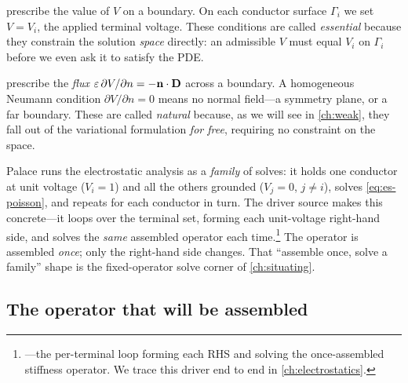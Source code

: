 \begin{description}[style=nextline,leftmargin=1em,font=\normalfont\itshape]
  \item[Dirichlet (essential) conditions] prescribe the value of $V$ on a
  boundary. On each conductor surface $\Gamma_i$ we set $V=V_i$, the applied
  terminal voltage. These conditions are called \emph{essential} because they
  constrain the solution \emph{space} directly: an admissible $V$ must equal
  $V_i$ on $\Gamma_i$ before we even ask it to satisfy the PDE.
  \item[Neumann (natural) conditions] prescribe the \emph{flux}
  $\varepsilon\,\partial V/\partial n = -\mathbf{n}\cdot\mathbf{D}$ across a boundary. A
  homogeneous Neumann condition $\partial V/\partial n = 0$ means no normal
  field---a symmetry plane, or a far boundary. These are called \emph{natural}
  because, as we will see in \cref{ch:weak}, they fall out of the variational
  formulation \emph{for free}, requiring no constraint on the space.
\end{description}

Palace runs the electrostatic analysis as a \emph{family} of solves: it holds
one conductor at unit voltage ($V_i=1$) and all the others grounded ($V_j=0$,
$j\neq i$), solves \cref{eq:es-poisson}, and repeats for each conductor in turn.
The driver source makes this concrete---it loops over the terminal set,
 forming each unit-voltage
right-hand side, and solves the \emph{same} assembled operator each
time.\footnote{---the
per-terminal loop forming each RHS and solving the once-assembled stiffness
operator. We trace this driver end to end in \cref{ch:electrostatics}.} The
operator is assembled \emph{once}; only the right-hand side changes. That
``assemble once, solve a family'' shape is the fixed-operator solve corner of
\cref{ch:situating}.

\subsection{The operator that will be assembled}


